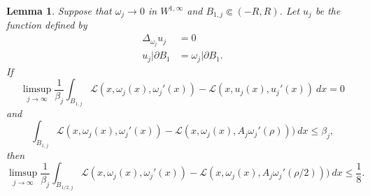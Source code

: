 \documentclass[reqno,12pt,letterpaper]{amsart}
\newtheorem{lemma}[theorem]{Lemma}
\theoremstyle{definition}
\numberwithin{equation}{section}
\begin{document}
\begin{lemma}
Suppose that $\omega_j \to 0$ in $W^{1, \infty}$ and $B_{1,j} \Subset (-R, R)$.
Let $u_j$ be the function defined by
\begin{align*}
\Delta_{\omega_j} u_j &= 0 \\
u_j|\partial B_1 &= \omega_j|\partial B_1.
\end{align*}
If
$$\limsup_{j \to \infty} \frac{1}{\beta_j} \int_{B_{1,j}} \mathscr L(x, \omega_j(x), \omega_j'(x)) - \mathscr L(x, u_j(x), u_j'(x)) ~dx = 0$$
and
$$\int_{B_{1,j}} \mathscr L(x, \omega_j(x), \omega_j'(x)) - \mathscr L(x, \omega_j(x), A_j \omega_j'(\rho))) ~dx \leq \beta_j,$$
then
$$\limsup_{j \to \infty} \frac{1}{\beta_j} \int_{B_{1/2,j}} \mathscr L(x, \omega_j(x), \omega_j'(x)) - \mathscr L(x, \omega_j(x), A_j \omega_j'(\rho/2))) ~dx \leq \frac{1}{8}.$$
\end{lemma}
\end{document}
